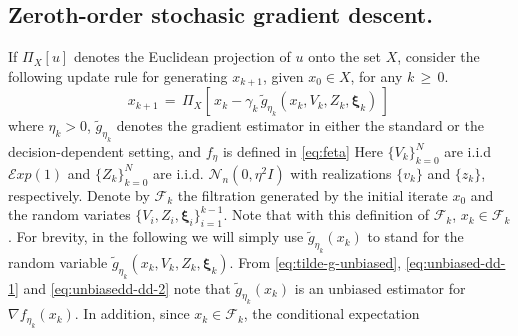 \documentclass[11pt,reqno]{amsart}
\newcommand{\1}{{\bf 1}}
\newcommand{\2}{{\bf 2}}
\newcommand{\us}[1]{\textcolor{red}{#1}}
\newcommand{\bxi}{\boldsymbol{\xi}}
\newcommand{\cf}{\mathcal F}
\numberwithin{equation}{section}
\theoremstyle{remark}
\begin{document}
{			\subsection{Zeroth-order stochasic gradient descent.}\label{sec:zo-method}
			If $\Pi_X[u]$ denotes the Euclidean projection of  $u$ onto the set $X$, 
			consider the following update rule for generating $x_{k+1}$, given $x_0 \in X$, for any $k \, \ge \, 0$.
			\begin{equation}\label{algstoc}
				x_{k+1}\, =\, \Pi_{X}\left[\, x_{k}-\gamma_{k}\,
				\tilde{g}_{\eta_k}(x_k, V_k, Z_k, \bxi_k)\, \right]\, 
			\end{equation}
			where $\eta_k > 0$, $\tilde{g}_{\eta_k}$ denotes the gradient estimator in either the standard or the decision-dependent setting, and $f_{\eta}$ is defined in \eqref{eq:feta} Here $\{V_k\}_{k=0}^N$ are i.i.d $\mathcal{E}xp(1)$ and $\{Z_k\}_{k=0}^N$ are i.i.d. $\mathcal{N}_n(0,\eta^2I)$ with realizations $\{v_k\}$ and $\{z_k\}$, respectively.
			Denote by $\cf_k$ the filtration generated by the initial iterate $x_0$ and the random variates $\{V_i, Z_i, \bxi_i\}_{i=1}^{k-1}$. Note that with this definition of $\cf_k$, $x_k \in \cf_k$. For brevity, in the following we will simply use $\tilde{g}_{\eta_k}(x_k)$ to stand for the random variable $\tilde{g}_{\eta_k}(x_k,V_k,Z_k,\bxi_k)$.
			From \eqref{eq:tilde-g-unbiased}, \eqref{eq:unbiased-dd-1} and \eqref{eq:unbiasedd-dd-2} note that $\tilde{g}_{\eta_k}(x_k)$ is an unbiased  estimator for $\nabla f_{\eta_k}(x_k)$. In addition, since $x_k \in \cf_k$, the conditional expectation  %
}
\end{document}

